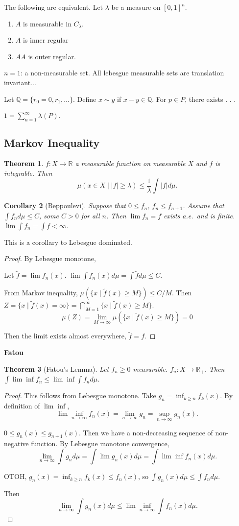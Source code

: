 \documentclass[11pt]{article}
\newtheorem{thm}{Theorem}[section]
\newtheorem{cor}[thm]{Corollary}
\newcommand{\ld}{\ldots}
\newcommand{\ra}{\rightarrow}
\newcommand{\la}{\lambda}
\newcommand{\su}[2]{\sum_{#1}^{#2}}
\newcommand{\bca}[2]{\bigcap_{#1}^{#2}}
\newcommand{\fr}[2]{\frac{#1}{#2}}
\newcommand{\re}{\mathbb{R}}
\newcommand{\q}{\mathbb{Q}}
\begin{document}
The following are equivalent. Let $\la$ be a measure on $[0,1]^n$. 
\begin{enumerate}
\item $A$ is measurable in $C_{\la}$. 

\item $A$ is inner regular
\item $AA$ is outer regular. 

\end{enumerate}

$n=1$: a non-measurable set. All lebesgue measurable sets are translation invariant...

Let $\q=\{r_0=0,r_1,\ld\}$. Define $x\sim y$ if $x-y\in\q$. For $p\in P$, there exists . . . 

$1=\su{n=1}{\infty}\la(P)$. 

\subsection{Markov Inequality}
\begin{thm}
$f:X\ra \re$ a measurable function on measurable $X$ and $f$ is integrable. Then \[\mu(x\in X\mid |f|\ge \la)\le \fr{1}{\la}\int|f|d\mu.\] 
\end{thm}


\begin{cor}[Beppoulevi]
Suppose that $0\le f_n$, $f_n\le f_{n+1}$. Assume that $\int f_nd\mu\le C$, some $C>0$ for all $n$. Then $\lim f_n=f$ exists a.e.\ and is finite. $\lim \int f_n=\int f<\infty$.  
\end{cor}
This is a corollary to Lebesgue dominated. 
\begin{proof}
By Lebesgue monotone, 

Let $\tilde f=\lim f_n(x)$. $\lim\int f_n(x)d\mu=\int\tilde fd\mu\le C$. 

From Markov inequality, $\mu(\{x\mid \tilde f(x)\ge M\})\le C/M$. Then $Z=\{x\mid \tilde f(x)=\infty\}=\bca{M=1}{\infty}\{x\mid \tilde f(x)\ge M\}$. 
\[\mu(Z)=\lim_{M\ra\infty}\mu(\{x\mid \tilde f(x)\ge M\})=0\]

Then the limit exists almost everywhere, $\tilde f=f$. 
\end{proof}

{\bf Fatou}

\begin{thm}[Fatou's Lemma]
Let $f_n\ge 0$ measurable. $f_n:X\ra \re_+$. Then $\int\lim\inf f_n\le \lim\inf\int f_nd\mu$. 
\end{thm}
\begin{proof}
This follows from Lebesgue monotone. 
Take $g_n=\inf_{k\ge n} f_k(x)$. By definition of $\lim\inf$, \[\lim\inf_{n\ra\infty}f_n(x)=\lim_{n\ra\infty}g_n=\sup_{n\ra\infty}g_n(x).\]

$0\le g_n(x)\le g_{n+1}(x)$. Then we have a non-decreasing sequence of non-negative function. By Lebesgue monotone convergence, \[\lim_{n\ra\infty}\int g_nd\mu=\int\lim g_n(x)d\mu=\int\lim\inf f_n(x)d\mu.\]

OTOH, $g_n(x)=\inf_{k\ge n}f_k(x)\le f_n(x)$, so $\int g_n(x)d\mu\le\int f_nd\mu$. 

Then \[\lim_{n\ra\infty}\int g_n(x)d\mu\le\lim\inf_{n\ra\infty}\int f_n(x)d\mu.\]
\end{proof}
\end{document}

